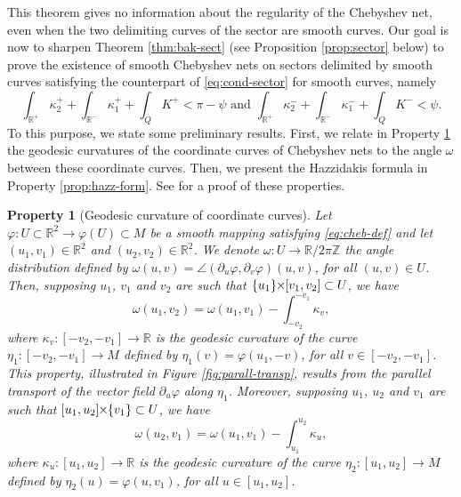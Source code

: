 \documentclass{article}
\newcommand{\PLH}{{\mkern-1mu\times\mkern-1mu}}
\newcommand{\Times}{\PLH}
\newcommand{\R}{\mathbb{R}}
\newcommand{\Z}{\mathbb{Z}}
\newcommand{\surf}{M}
\newcommand{\ko}{\kappa}
\newcommand{\DU}{\partial_{u}}
\newcommand{\DV}{\partial_{v}}
\newcommand{\sect}{Q}
\newtheorem{proprieteE}[theorem]{Property}
\theoremstyle{remark}
\theoremstyle{prpart}
\begin{document}
This theorem gives no information about the regularity of the Chebyshev net, even when the two delimiting curves of the sector are smooth curves. 
Our goal is now to sharpen Theorem \ref{thm:bak-sect} (see Proposition \ref{prop:sector} below) to prove the existence of smooth Chebyshev nets on sectors delimited by smooth curves satisfying the counterpart of \eqref{eq:cond-sector} for smooth curves, namely
\begin{equation}\label{eq:cond-primal}
\int_{\R^+} \ko_2^+ + \int_{\R^-} \ko_1^+ + \int_{\sect} K^+ < \pi-\psi \text{ and } \int_{\R^+} \ko_2^- + \int_{\R^-} \ko_1^- + \int_\sect K^- < \psi.
\end{equation}
To this purpose, we state some preliminary results. First, we relate in Property \ref{prop:geod-curv-c4} the geodesic curvatures of the coordinate curves of Chebyshev nets to the angle $\omega$ between these coordinate curves. Then, we present the Hazzidakis formula in Property \ref{prop:hazz-form}.
See \cite{Ghys09} for a proof of these properties. 
\begin{proprieteE}[Geodesic curvature of coordinate curves]\label{prop:geod-curv-c4}
  Let $\varphi:U\subset\R^2\to\varphi(U)\subset\surf$ be a smooth mapping satisfying \eqref{eq:cheb-def} and let $(u_1,v_1)\in\R^2$ and $(u_2,v_2)\in\R^2$. We denote $\omega:U\to\R/2\pi\Z$ the angle distribution defined by $\omega(u,v) = \angle(\DU\varphi,\DV\varphi)(u,v)$, for all $(u,v)\in U$. Then, supposing $u_1$, $v_1$ and $v_2$ are such that $\{u_1\}\Times[v_1,v_2]\subset U$, we have 
  \begin{equation}\label{eq:courb-geod-v}
    \omega(u_1,v_2) = \omega(u_1,v_1)-\int_{-v_2}^{-v_1}\ko_v,
  \end{equation}
  where $\ko_v:[-v_2,-v_1]\to\R$ is the geodesic curvature of the curve $\eta_1:[-v_2,-v_1]\to\surf$ defined by $\eta_1(v) = \varphi(u_1,-v)$, for all $v\in[-v_2,-v_1]$. This property, illustrated in Figure \ref{fig:parall-transp}, results from the parallel transport of the vector field $\DU\varphi$ along $\eta_1$. Moreover, supposing $u_1$, $u_2$ and $v_1$ are such that $[u_1,u_2]\Times\{v_1\}\subset U$, we have 
  \begin{equation}\label{eq:courb-geod-u}
    \omega(u_2,v_1) = \omega(u_1,v_1)-\int_{u_1}^{u_2}\ko_u,
  \end{equation}
  where $\ko_u:[u_1,u_2]\to\R$ is the geodesic curvature of the curve $\eta_2:[u_1,u_2]\to\surf$ defined by $\eta_2(u) = \varphi(u,v_1)$, for all $u\in[u_1,u_2]$.
\end{proprieteE}
\end{document}
